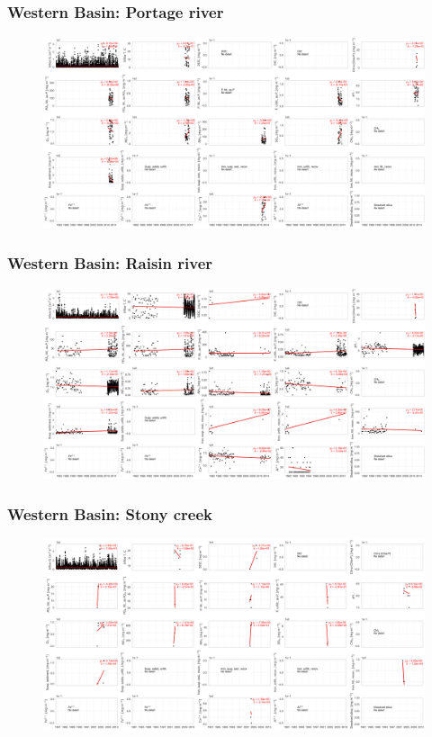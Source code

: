 \documentclass{beamer}
\begin{document}
\begin{frame}
\frametitle{Western Basin: Portage river}

\begin{figure}
\includegraphics[width=\textwidth]{rivers/Western basin/portageriver.png}
\end{figure}

\end{frame}


\begin{frame}
\frametitle{Western Basin: Raisin river}

\begin{figure}
\includegraphics[width=\textwidth]{rivers/Western basin/riverraisin.png}
\end{figure}

\end{frame}


\begin{frame}
\frametitle{Western Basin: Stony creek}

\begin{figure}
\includegraphics[width=\textwidth]{rivers/Western basin/stonycreek.png}
\end{figure}

\end{frame}
\end{document}
